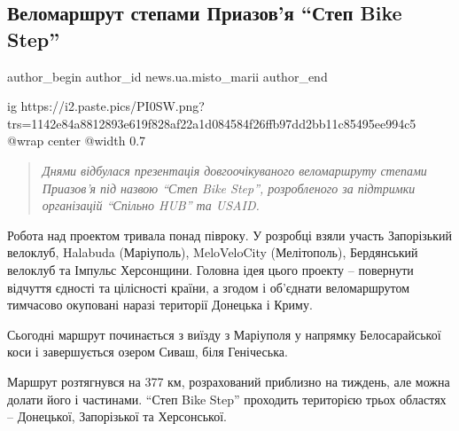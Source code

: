  
 
 
 
 
 
\subsection{Веломаршрут степами Приазов'я \enquote{Степ Bike Step}}
\label{sec:27_11_2021.stz.news.ua.misto_marii.1.velomarshrut_step_bike_step}
 
\ifcmt
 author_begin
   author_id news.ua.misto_marii
 author_end
\fi

\ifcmt
  ig https://i2.paste.pics/PI0SW.png?trs=1142e84a8812893e619f828af22a1d084584f26ffb97dd2bb11c85495ee994c5
  @wrap center
  @width 0.7
\fi

\begin{quote}
\em
Днями відбулася презентація довгоочікуваного веломаршруту степами Приазов'я під
назвою \enquote{Степ Bike Step}, розробленого за підтримки організацій \enquote{Спільно HUB} та
USAID.	
\end{quote}


Робота над проектом тривала понад півроку. У розробці взяли участь Запорізький
велоклуб, Halabuda (Маріуполь), MeloVeloCity (Мелітополь), Бердянський велоклуб
та Імпульс Херсонщини. Головна ідея цього проекту – повернути відчуття єдності
та цілісності країни, а згодом і об'єднати веломаршрутом тимчасово окуповані
наразі території Донецька і Криму.

Сьогодні маршрут починається з виїзду з Маріуполя у напрямку Белосарайської
коси і завершується озером Сиваш, біля Генічеська.

Маршрут розтягнувся на 377 км, розрахований приблизно на тиждень, але можна
долати його і частинами. \enquote{Степ Bike Step} проходить територією трьох
областях – Донецької, Запорізької та Херсонської.

